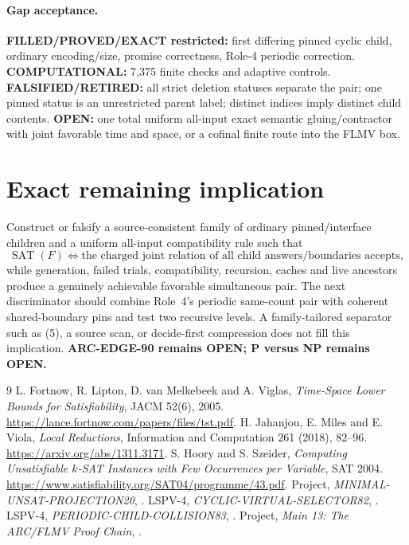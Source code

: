 \documentclass[11pt]{article}
\newcommand{\SAT}{\operatorname{SAT}}
\begin{document}
\paragraph{Gap acceptance.}
\textbf{FILLED/PROVED/EXACT restricted:} first differing pinned cyclic child,
ordinary encoding/size, promise correctness, Role-4 periodic correction.
\textbf{COMPUTATIONAL:} 7,375 finite checks and adaptive controls.
\textbf{FALSIFIED/RETIRED:} all strict deletion statuses separate the pair;
one pinned status is an unrestricted parent label; distinct indices imply
distinct child contents.  \textbf{OPEN:} one total uniform all-input exact
semantic gluing/contractor with joint favorable time and space, or a cofinal
finite route into the FLMV box.

\section{Exact remaining implication}
Construct or falsify a source-consistent family of ordinary pinned/interface
children and a uniform all-input compatibility rule such that
\[
 \SAT(F)\Longleftrightarrow
 \text{the charged joint relation of all child answers/boundaries accepts},
\]
while generation, failed trials, compatibility, recursion, caches and live
ancestors produce a genuinely achievable favorable simultaneous pair.  The
next discriminator should combine Role~4's periodic same-count pair with
coherent shared-boundary pins and test two recursive levels.  A family-tailored
separator such as (5), a source scan, or decide-first compression does not
fill this implication.  \textbf{ARC-EDGE-90 remains OPEN; P versus NP remains
OPEN.}

\begin{thebibliography}{9}
 L. Fortnow, R. Lipton, D. van Melkebeek and A. Viglas,
\emph{Time-Space Lower Bounds for Satisfiability}, JACM 52(6), 2005.
\url{https://lance.fortnow.com/papers/files/tst.pdf}.
 H. Jahanjou, E. Miles and E. Viola, \emph{Local
Reductions}, Information and Computation 261 (2018), 82--96.
\url{https://arxiv.org/abs/1311.3171}.
 S. Hoory and S. Szeider, \emph{Computing
Unsatisfiable $k$-SAT Instances with Few Occurrences per Variable}, SAT 2004.
\url{https://www.satisfiability.org/SAT04/programme/43.pdf}.
 Project, \emph{MINIMAL-UNSAT-PROJECTION20},
.
 LSPV-4, \emph{CYCLIC-VIRTUAL-SELECTOR82},
.
 LSPV-4, \emph{PERIODIC-CHILD-COLLISION83},
.
 Project, \emph{Main 13: The ARC/FLMV Proof Chain},
.
\end{thebibliography}
\end{document}
